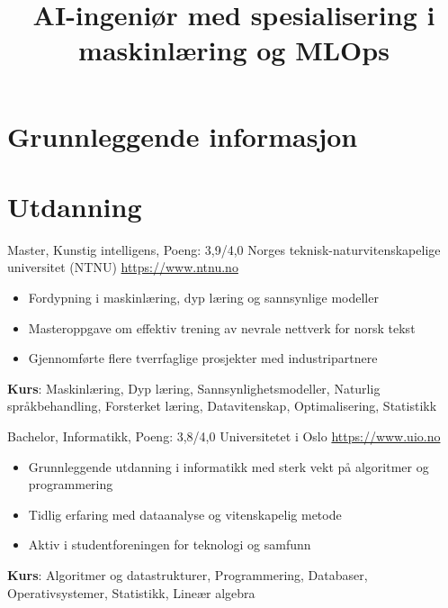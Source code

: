 \documentclass[a4paper, serif, 10pt]{moderncv}
\title{AI-ingeniør med spesialisering i maskinlæring og MLOps}
\begin{document}
\maketitle

\section{Grunnleggende informasjon}

\section{Utdanning}

        {Master, Kunstig intelligens, Poeng: 3,9/4,0}
        {Norges teknisk-naturvitenskapelige universitet (NTNU)}
        {\url{https://www.ntnu.no}}
        {}
        {\begin{itemize}
\item Fordypning i maskinlæring, dyp læring og sannsynlige modeller
\item Masteroppgave om effektiv trening av nevrale nettverk for norsk tekst
\item Gjennomførte flere tverrfaglige prosjekter med industripartnere
\end{itemize}
\textbf{Kurs}: Maskinlæring, Dyp læring, Sannsynlighetsmodeller, Naturlig språkbehandling, Forsterket læring, Datavitenskap, Optimalisering, Statistikk}

        {Bachelor, Informatikk, Poeng: 3,8/4,0}
        {Universitetet i Oslo}
        {\url{https://www.uio.no}}
        {}
        {\begin{itemize}
\item Grunnleggende utdanning i informatikk med sterk vekt på algoritmer og programmering
\item Tidlig erfaring med dataanalyse og vitenskapelig metode
\item Aktiv i studentforeningen for teknologi og samfunn
\end{itemize}
\textbf{Kurs}: Algoritmer og datastrukturer, Programmering, Databaser, Operativsystemer, Statistikk, Lineær algebra}
\end{document}
